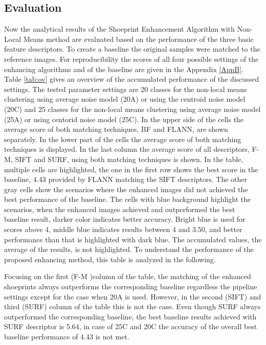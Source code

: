 \documentclass[draft,final]{vutinfth} %
\begin{document}
\subsection{Evaluation}
\par
Now the analytical results of the Shoeprint Enhancement Algorithm with Non-Local Means method are evaluated based on the performance of  the three basic feature descriptors.
To create a baseline the original samples were matched to the reference images.
For reproducibility the scores of all four possible settings  of the enhancing algorithms and of the baseline are given in the Appendix \ref{AppB}.
Table \ref{tab:ov} gives an overview of the accumulated performance of the discussed settings.
The tested parameter settings are 20 classes for the non-local means clustering using average noise model (20A) or using the centroid noise model (20C) and 25 classes for the non-local means clustering using average noise model (25A) or using centorid noise model (25C).
In the upper side of the cells the average score of both matching techniques, BF and FLANN, are shown separately.
In the lower part of the cells the average score of both matching techniques is displayed.
In the last column the average score of all descriptors, F-M, SIFT and SURF, using both matching techniques is shown.
In the table, multiple cells are highlighted, the one in the first row shows the best score in the baseline, 4.43 provided by FLANN matching the SIFT descriptors.
The other gray cells show the scenarios where the enhanced images did not achieved the best performance of the baseline.
The cells with blue background highlight the scenarios, when the enhanced images achieved and outperformed the best baseline result, darker color indicates better accuracy.
Bright blue is used for scores above 4, middle blue indicates results between 4 and 3.50, and better performance than that is highlighted with dark blue.
The accumulated values, the average of the results, is not highlighted.
To understand the performance of the proposed enhancing method, this table is analyzed in the following.
\par
Focusing on the first (F-M )column of the table, the matching of the enhanced shoeprints always outperforms the corresponding baseline regardless the pipeline settings except for the case when 20A is used. 
However, in the second (SIFT) and third (SURF) column of the table this is not the case.
Even though SURF always outperformed the corresponding baseline, the best baseline results achieved with SURF descriptor is 5.64, in case of 25C and 20C the accuracy of the overall best baseline performance of 4.43 is not met.
\end{document}
